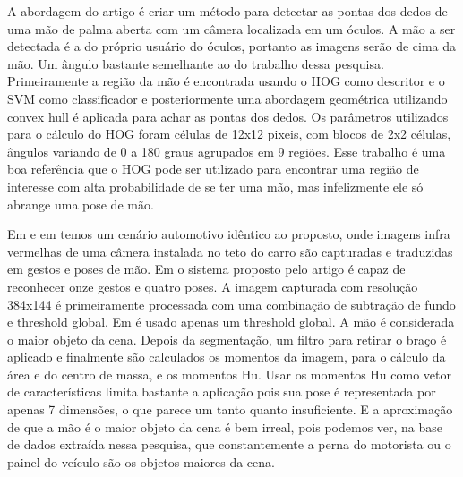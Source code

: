 A abordagem do artigo \cite{jiang2012robust} é criar um método para detectar as pontas dos dedos de uma mão de palma aberta com um câmera localizada em um óculos. A mão a ser detectada é a do próprio usuário do óculos, portanto as imagens serão de cima da mão. Um ângulo bastante semelhante ao do trabalho dessa pesquisa. Primeiramente a região da mão é encontrada usando o HOG como descritor e o SVM como classificador e posteriormente uma abordagem geométrica utilizando convex hull é aplicada para achar as pontas dos dedos. Os parâmetros utilizados para o cálculo do HOG foram células de 12x12 pixeis, com blocos de 2x2 células, ângulos variando de 0 a 180 graus agrupados em 9 regiões. Esse trabalho é uma boa referência que o HOG pode ser utilizado para encontrar uma região de interesse com alta probabilidade de se ter uma mão, mas infelizmente ele só abrange uma pose de mão.


Em \cite{zobl2004gesture} e em \cite{akyol2000gesture} temos um cenário automotivo idêntico ao proposto, onde imagens infra vermelhas de uma câmera instalada no teto do carro são capturadas e traduzidas em gestos e poses de mão. Em \cite{zobl2004gesture} o sistema proposto pelo artigo é capaz de reconhecer onze gestos e quatro poses. A imagem capturada com resolução 384x144 é primeiramente processada com uma combinação de subtração de fundo e threshold global. Em \cite{akyol2000gesture} é usado apenas um threshold global. A mão é considerada o maior objeto da cena. Depois da segmentação, um filtro para retirar o braço é aplicado e finalmente são calculados os momentos da imagem, para o cálculo da área e do centro de massa, e os momentos Hu. Usar os momentos Hu como vetor de características limita bastante a aplicação pois sua pose é representada por apenas 7 dimensões, o que parece um tanto quanto insuficiente. E a aproximação de que a mão é o maior objeto da cena é bem irreal, pois podemos ver, na base de dados extraída nessa pesquisa, que constantemente a perna do motorista ou o painel do veículo são os objetos maiores da cena.

